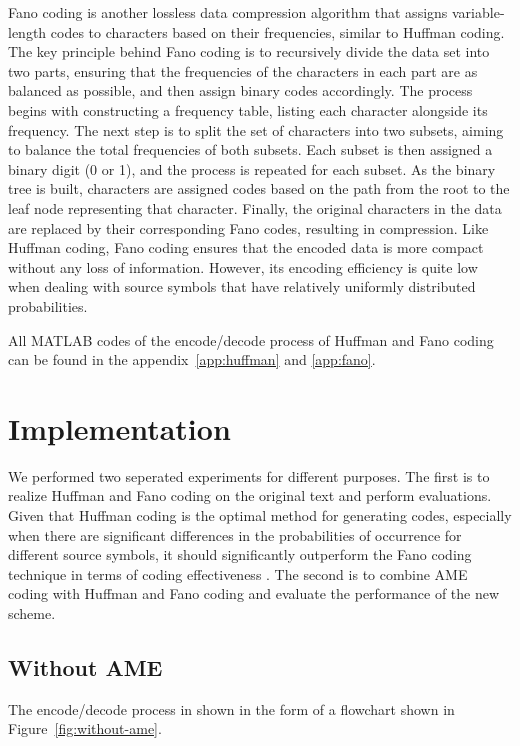 \documentclass[12pt,twoside]{article}
\begin{document}
Fano coding is another lossless data compression algorithm that assigns variable-length codes to characters based on their frequencies, similar to Huffman coding. The key principle behind Fano coding is to recursively divide the data set into two parts, ensuring that the frequencies of the characters in each part are as balanced as possible, and then assign binary codes accordingly. The process begins with constructing a frequency table, listing each character alongside its frequency. The next step is to split the set of characters into two subsets, aiming to balance the total frequencies of both subsets. Each subset is then assigned a binary digit (0 or 1), and the process is repeated for each subset. As the binary tree is built, characters are assigned codes based on the path from the root to the leaf node representing that character. Finally, the original characters in the data are replaced by their corresponding Fano codes, resulting in compression. Like Huffman coding, Fano coding ensures that the encoded data is more compact without any loss of information. However, its encoding efficiency is quite low when dealing with source symbols that have relatively uniformly distributed probabilities.

All MATLAB codes of the encode/decode process of Huffman and Fano coding can be found in the appendix~\ref{app:huffman} and \ref{app:fano}.

\section{Implementation}

We performed two seperated experiments for different purposes. The first is to realize Huffman and Fano coding on the original text and perform evaluations. Given that Huffman coding is the optimal method for generating codes, especially when there are significant differences in the probabilities of occurrence for different source symbols, it should significantly outperform the Fano coding technique in terms of coding effectiveness \cite{ref3, ref4}. The second is to combine AME coding with Huffman and Fano coding and evaluate the performance of the new scheme.

\subsection{Without AME}

The encode/decode process in shown in the form of a flowchart shown in Figure~\ref{fig:without-ame}.
\end{document}

